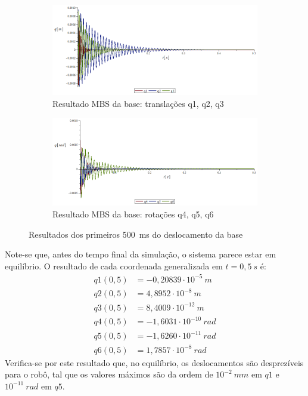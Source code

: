 \begin{figure}[h]
    \centering
    \begin{subfigure}[b]{0.8\textwidth}
        \includegraphics[width=\textwidth]{figs/q123_base_exemplo}
        \caption{Resultado MBS da base: translações q1, q2, q3}
        \label{fig::q123_base_exemplo}
    \end{subfigure}
    \quad %
    \begin{subfigure}[b]{0.8\textwidth}
        \includegraphics[width=\textwidth]{figs/q456_base_exemplo}
        \caption{Resultado MBS da base: rotações q4, q5, q6}
        \label{fig::q456_base_exemplo}
    \end{subfigure}
    \caption{Resultados dos primeiros 500~ms do deslocamento da base}
    \label{fig::res_qbase_exemplo}
\end{figure}

Note-se que, antes do tempo final da simulação, o sistema parece estar em
equilíbrio. O resultado de cada coordenada generalizada em $t=0,5~s$ é:
%
\begin{align*}
	q1(0,5) &= -0,20839\cdot 10^{-5}~m \\
	q2(0,5) &= 4,8952\cdot 10^{-8}~m \\
	q3(0,5) &= 8,4009 \cdot 10^{-12}~m \\
	q4(0,5) &= -1,6031\cdot 10^{-10}~rad \\
	q5(0,5)	&= -1,6260\cdot 10^{-11}~rad \\
	q6(0,5) &= 1,7857\cdot 10^{-8}~rad
\end{align*}
%
Verifica-se por este resultado que, no equilíbrio, os deslocamentos são
desprezíveis para o robô, tal que os valores máximos são da ordem de
$10^{-2}~mm$ em $q1$ e $10^{-11}~rad$ em $q5$.








